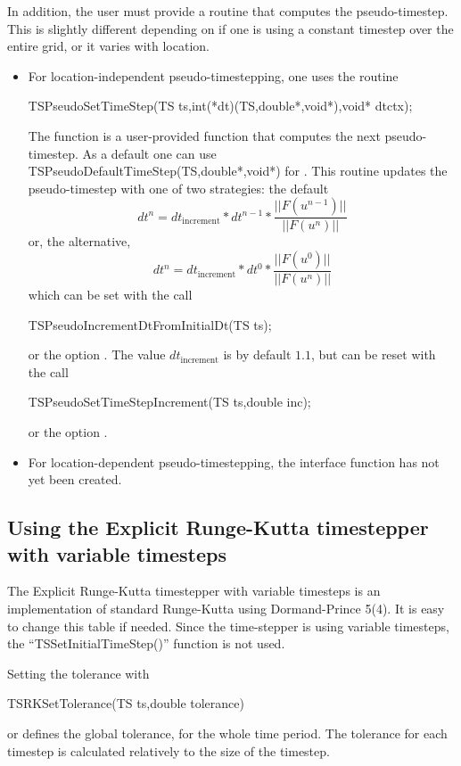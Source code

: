 In addition, the user must provide a routine that computes the 
pseudo-timestep. This is slightly different depending on if 
one is using a constant timestep over the entire grid, or it varies
with location. 
\begin{itemize}
\item For location-independent pseudo-timestepping, one uses the routine 
\begin{tabbing}
 TSPseudoSetTimeStep(TS ts,int(*dt)(TS,double*,void*),void* dtctx);
\end{tabbing}
The function  is a user-provided function that computes the next 
pseudo-timestep. As a default one can use
TSPseudoDefaultTimeStep(TS,double*,void*) for . This routine
updates the pseudo-timestep with one of two strategies: the default
\[
   dt^{n} = dt_{\mathrm{increment}}*dt^{n-1}*\frac{|| F(u^{n-1}) ||}{|| F(u^{n})||}
\]
or, the alternative, 
\[
   dt^{n} = dt_{\mathrm{increment}}*dt^{0}*\frac{|| F(u^{0}) ||}{|| F(u^{n})||}
\]
which can be set with the call
\begin{tabbing}
 TSPseudoIncrementDtFromInitialDt(TS ts);
\end{tabbing}
or 
the option . 
The value $ dt_{\mathrm{increment}} $ is by default $ 1.1$, but can be reset with the 
call 
\begin{tabbing}
 TSPseudoSetTimeStepIncrement(TS ts,double inc); 
\end{tabbing}
or  the option 
. 


\item For location-dependent pseudo-timestepping, the interface function
      has not yet been created.
\end{itemize}

\subsection{Using the Explicit Runge-Kutta timestepper with variable timesteps}
The Explicit Runge-Kutta timestepper with variable timesteps is an 
implementation of standard Runge-Kutta using Dormand-Prince 
5(4). It is easy to change this table if needed. Since the time-stepper is using variable timesteps, the
``TSSetInitialTimeStep()'' function is not used.

Setting the tolerance with 
\begin{tabbing}
TSRKSetTolerance(TS ts,double tolerance)
\end{tabbing}
or   
defines the global tolerance, for the whole time
period. The tolerance for each timestep is calculated relatively to
the size of the timestep.

